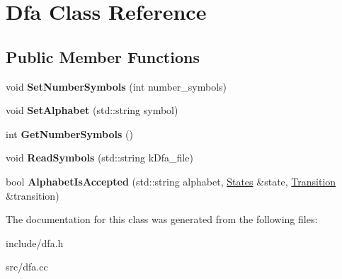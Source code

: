 \hypertarget{classDfa}{}\section{Dfa Class Reference}
\label{classDfa}
\subsection*{Public Member Functions}
\begin{DoxyCompactItemize}
\item 
\mbox{\label{classDfa_ac022a12536c2a855066fdfd85fba5ed9}} 
void {\bfseries Set\+Number\+Symbols} (int number\+\_\+symbols)
\item 
\mbox{\label{classDfa_a094525697d759c4b5b36bf562d920916}} 
void {\bfseries Set\+Alphabet} (std\+::string symbol)
\item 
\mbox{\label{classDfa_a21239eac92e02d748bdc5cee0c52b831}} 
int {\bfseries Get\+Number\+Symbols} ()
\item 
\mbox{\label{classDfa_ac596e302028cb885e1a8eae2f1f60e69}} 
void {\bfseries Read\+Symbols} (std\+::string k\+Dfa\+\_\+file)
\item 
\mbox{\label{classDfa_a0de3553aca8cf0329bf12a7b1acaa291}} 
bool {\bfseries Alphabet\+Is\+Accepted} (std\+::string alphabet, \hyperlink{classStates}{States} \&state, \hyperlink{classTransition}{Transition} \&transition)
\end{DoxyCompactItemize}


The documentation for this class was generated from the following files\+:\begin{DoxyCompactItemize}
\item 
include/dfa.\+h\item 
src/dfa.\+cc\end{DoxyCompactItemize}
